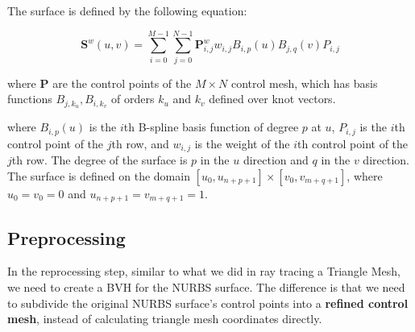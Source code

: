 \documentclass[acmtog]{acmart}
\begin{document}
The surface is defined by the following equation: 

\begin{equation}
	\label{eq:1} %
	\mathbf{S}^w(u,v) = \sum_{i=0}^{M-1} \sum_{j=0}^{N-1} \mathbf{P}_{i,j}^w w_{i,j} B_{i,p}(u) B_{j,q}(v) P_{i,j}
\end{equation}

where $\mathbf{P}$ are the control points of the $M\times N$ control mesh, which has basis functions $B_{j,k_u}, B_{i, k_v}$ of orders $k_u$ and $k_v$ defined over knot vectors.

where $B_{i,p}(u)$ is the $i$th B-spline basis function of degree $p$ at $u$, $P_{i,j}$ is the $i$th control point of the $j$th row, and $w_{i,j}$ is the weight of the $i$th control point of the $j$th row. The degree of the surface is $p$ in the $u$ direction and $q$ in the $v$ direction. The surface is defined on the domain $[u_{0}, u_{n+p+1}] \times [v_{0}, v_{m+q+1}]$, where $u_{0} = v_{0} = 0$ and $u_{n+p+1} = v_{m+q+1} = 1$. 




\subsection{Preprocessing}

In the reprocessing step, 
similar to what we did in ray tracing a Triangle Mesh, we need to create a BVH for the NURBS surface. The difference is that we need to subdivide the original NURBS surface's control points into a \textbf{refined control mesh}, instead of calculating triangle mesh coordinates directly. 
\end{document}
